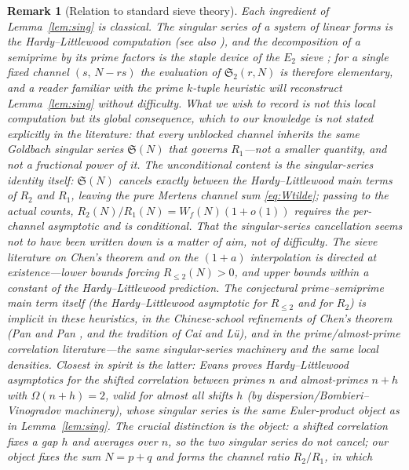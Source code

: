 \documentclass[]{interact}%
\newtheorem{remark}{Remark}
\newcommand{\OmegaF}{\Omega}
\newcommand{\sing}{\mathfrak S}
\begin{document}
\begin{remark}[Relation to standard sieve theory]\label{rem:identity-novelty}
Each ingredient of Lemma~\ref{lem:sing} is classical. The singular series of a system of linear
forms is the Hardy--Littlewood computation \citep{hardylittlewood1923} (see also
\citep{vaughan1997}), and the decomposition of a semiprime by its prime factors is the staple
device of the $E_2$ sieve \citep{halberstamrichert}; for a single fixed channel $(s,\,N-rs)$
the evaluation of $\sing_2(r,N)$ is therefore elementary, and a reader familiar with the prime
$k$-tuple heuristic will reconstruct Lemma~\ref{lem:sing} without difficulty. What we wish to
record is not this local computation but its global consequence, which to our knowledge is not
stated explicitly in the literature: that every unblocked channel inherits the \emph{same}
Goldbach singular series $\sing(N)$ that governs $R_1$---not a smaller quantity, and not a
fractional power of it. The unconditional content is the singular-series identity itself:
$\sing(N)$ cancels \emph{exactly} between the Hardy--Littlewood main terms of $R_2$ and $R_1$,
leaving the pure Mertens channel sum \eqref{eq:Wtilde}; passing to the actual counts,
$R_2(N)/R_1(N)=W_f(N)(1+o(1))$ requires the per-channel asymptotic and is conditional. That the
singular-series cancellation seems not to have been written down is a matter of aim, not of
difficulty. The sieve literature on Chen's theorem and on the $(1+a)$
interpolation \citep{chen1973,halberstamrichert,li2026} is directed at \emph{existence}---lower
bounds forcing $R_{\le2}(N)>0$, and upper bounds within a constant of the Hardy--Littlewood
prediction. The conjectural prime--semiprime main term itself (the Hardy--Littlewood asymptotic for
$R_{\le2}$ and for $R_2$) is implicit in these heuristics, in the Chinese-school refinements of
Chen's theorem (Pan and Pan \citep{panpan}, and the tradition of Cai and L\"u), and in the
prime/almost-prime correlation literature---the same singular-series machinery and the same
local densities. Closest in spirit is the latter: Evans \citep{evans2021} proves
Hardy--Littlewood asymptotics for the shifted correlation between primes $n$ and almost-primes
$n+h$ with $\OmegaF(n+h)=2$, valid for almost all shifts $h$ (by dispersion/Bombieri--Vinogradov
machinery), whose singular series is the same Euler-product object as in Lemma~\ref{lem:sing}. The crucial distinction is the \emph{object}: a shifted
correlation fixes a gap $h$ and averages over $n$, so the two singular series do \emph{not}
cancel; our object fixes the sum $N=p+q$ and forms the channel \emph{ratio} $R_2/R_1$, in which

\end{remark}
\end{document}
